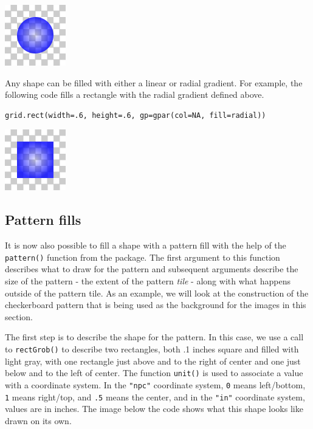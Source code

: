 \includegraphics{murrell-definitions-2023_files/figure-latex/unnamed-chunk-6-1.png}

Any shape can be filled with either a linear or radial gradient.
For example, the following code fills a rectangle with the
radial gradient defined above.

\begin{verbatim}
grid.rect(width=.6, height=.6, gp=gpar(col=NA, fill=radial))
\end{verbatim}

\includegraphics{murrell-definitions-2023_files/figure-latex/unnamed-chunk-7-1.png}

\hypertarget{pattern-fills}{%
\subsection{Pattern fills}\label{pattern-fills}}

It is now also possible to
fill a shape with a pattern fill with the help of the
\texttt{pattern()} function from the  package.
The first argument to this function describes what to draw for the
pattern and subsequent arguments describe the size of the pattern - the
extent of the pattern \emph{tile} - along with what happens outside of the
pattern tile.
As an example, we will look at the construction of the checkerboard pattern
that is being used as the background for the
images in this section.

The first step is to describe the shape for the pattern.
In this case, we use a call to \texttt{rectGrob()} to describe
two rectangles, both .1 inches square and filled with light gray,
with one rectangle just above and to the right
of center and one just below and to the left of center.
The  function \texttt{unit()} is used to associate a value with
a coordinate system. In the \texttt{"npc"} coordinate system, \texttt{0}
means left/bottom, \texttt{1} means right/top, and \texttt{.5} means the
center, and in the \texttt{"in"} coordinate system, values are in inches.
The image below the code shows what this shape looks like
drawn on its own.

